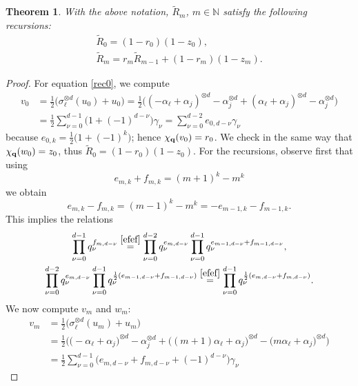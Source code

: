 \documentclass[10pt,a4paper]{amsart}
\numberwithin{equation}{section}
\newtheorem{Theorem}{Theorem}[section]
\newcommand{\NN }{\mathbb{N}}
\newcommand{\qq }{{\bf q}}
\newcommand{\dn }{d}
\newcommand{\qR }{\tilde R}
\begin{document}
\begin{Theorem}\label{rosso_rec_d}
With the above notation, $\qR_m$, $m\in\NN$ satisfy the following recursions:
\begin{gather}%
\label{rec0} \qR_0 = (1-r_0)(1-z_0),\\
\label{rec1} \qR_m = r_m \qR_{m-1} + (1-r_m)(1-z_m).
\end{gather}
\end{Theorem}



\begin{proof}
For equation \eqref{rec0}, we compute
\begin{align*}
v_0 &= \frac{1}{2} \big(\sigma_\ell^{\otimes \dn}(u_0)+u_0\big)
= \frac{1}{2}\big((-\alpha_\ell+\alpha_j)^{\otimes \dn} - \alpha_j^{\otimes \dn}
 + (\alpha_\ell+\alpha_j)^{\otimes \dn} - \alpha_j^{\otimes \dn} \big) \\
&= \frac{1}{2}\sum_{\nu=0}^{d-1}\big(1+(-1)^{\dn-\nu}\big)\gamma_\nu
= \sum_{\nu=0}^{d-2} e_{0,\dn-\nu}\gamma_\nu
\end{align*}
because $e_{0,k}=\frac{1}{2}\big(1+(-1)^k\big)$; hence $\chi_\qq(v_0)=r_0$.
We check in the same way that $\chi_\qq(w_0)=z_0$, thus $\qR_0=(1-r_0)(1-z_0)$.
For the recursions, observe first that using
\[e_{m,k}+f_{m,k} = (m+1)^k-m^k\] we obtain
\begin{equation}\label{efef}
e_{m,k}-f_{m,k} = (m-1)^k-m^k = -e_{m-1,k}-f_{m-1,k}.
\end{equation}
This implies the relations
\begin{gather}
\label{ef1} \prod_{\nu=0}^{d-1} q_\nu^{f_{m,\dn-\nu}} \stackrel{\eqref{efef}}{=}
\prod_{\nu=0}^{d-2} q_\nu^{e_{m,\dn-\nu}}
\prod_{\nu=0}^{\dn-1} q_\nu^{e_{m-1,\dn-\nu}+f_{m-1,\dn-\nu}}, \\
\label{ef2} \prod_{\nu=0}^{d-2} q_\nu^{e_{m,\dn-\nu}}
\prod_{\nu=0}^{\dn-1} q_\nu^{\frac{1}{2}(e_{m-1,\dn-\nu}+f_{m-1,\dn-\nu})}
\stackrel{\eqref{efef}}{=} \prod_{\nu=0}^{\dn-1} q_\nu^{\frac{1}{2}(e_{m,\dn-\nu}+f_{m,\dn-\nu})}.
\end{gather}
We now compute $v_m$ and $w_m$:
\begin{align*}
v_m &= \frac{1}{2} \big(\sigma_\ell^{\otimes \dn}(u_m)+u_m\big) \\
&= \frac{1}{2}\big(\big(-\alpha_\ell+\alpha_j\big)^{\otimes \dn} - \alpha_j^{\otimes \dn}
 +\big((m+1)\alpha_\ell+\alpha_j\big)^{\otimes \dn} - \big(m\alpha_\ell+\alpha_j\big)^{\otimes \dn} \big) \\
&= \frac{1}{2}\sum_{\nu=0}^{d-1}\big(e_{m,\dn-\nu}+f_{m,\dn-\nu}+(-1)^{\dn-\nu}\big)\gamma_\nu

\end{align*}
\end{proof}
\end{document}
